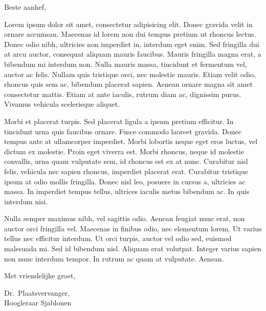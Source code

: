 \documentclass[11pt]{letter}
\date{January 1, 1970}
\begin{document}
\begin{letterhead}

    Beste aanhef,

    Lorem ipsum dolor sit amet, consectetur adipisicing elit. Donec gravida velit in ornare accumsan. Maecenas id lorem non dui tempus pretium ut rhoncus lectus. Donec odio nibh, ultricies non imperdiet in, interdum eget enim. Sed fringilla dui at arcu auctor, consequat aliquam mauris faucibus. Mauris fringilla magna erat, a bibendum mi interdum non. Nulla mauris massa, tincidunt et fermentum vel, auctor ac felis. Nullam quis tristique orci, nec molestie mauris. Etiam velit odio, rhoncus quis sem ac, bibendum placerat sapien. Aenean ornare magna sit amet consectetur mattis. Etiam at ante iaculis, rutrum diam ac, dignissim purus. Vivamus vehicula scelerisque aliquet.

    Morbi et placerat turpis. Sed placerat ligula a ipsum pretium efficitur. In tincidunt urna quis faucibus ornare. Fusce commodo laoreet gravida. Donec tempus ante at ullamcorper imperdiet. Morbi lobortis neque eget eros luctus, vel dictum ex molestie. Proin eget viverra est. Morbi rhoncus, neque id molestie convallis, urna quam vulputate sem, id rhoncus est ex at nunc. Curabitur nisl felis, vehicula nec sapien rhoncus, imperdiet placerat erat. Curabitur tristique ipsum at odio mollis fringilla. Donec nisl leo, posuere in cursus a, ultricies ac massa. In imperdiet tempus tellus, ultrices iaculis metus bibendum ac. In quis interdum nisi.

    Nulla semper maximus nibh, vel sagittis odio. Aenean feugiat nunc erat, non auctor orci fringilla vel. Maecenas in finibus odio, nec elementum lorem. Ut varius tellus nec efficitur interdum. Ut orci turpis, auctor vel odio sed, euismod malesuada mi. Sed id bibendum nisl. Aliquam erat volutpat. Integer varius sapien non nunc interdum tempor. In rutrum ac quam at vulputate. Aenean.

    Met vriendelijke groet,

    Dr.~Plaatsvervanger, \\ Hoogleraar Sjablonen

\end{letterhead}
\end{document}
